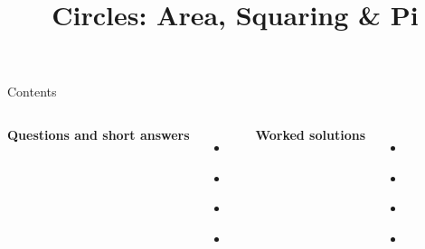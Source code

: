 \documentclass{beamer}
\title{Circles: Area, Squaring \& Pi}
\author{}
\date{}
\begin{document}
\frame{\titlepage}

\begin{frame}{Contents}
\small
\begin{columns}[T]
\textbf{Questions and short answers}
\begin{itemize}
  \item \hyperlink{q-st1}{}
  \item \hyperlink{q-st2}{}
  \item \hyperlink{q-st3}{}
  \item \hyperlink{q-st4}{}
\end{itemize}

\textbf{Worked solutions}
\begin{itemize}
  \item \hyperlink{work-st1}{}
  \item \hyperlink{work-st2}{}
  \item \hyperlink{work-st3}{}
  \item \hyperlink{work-st4}{}
\end{itemize}
\end{columns}
\end{frame}
\end{document}
